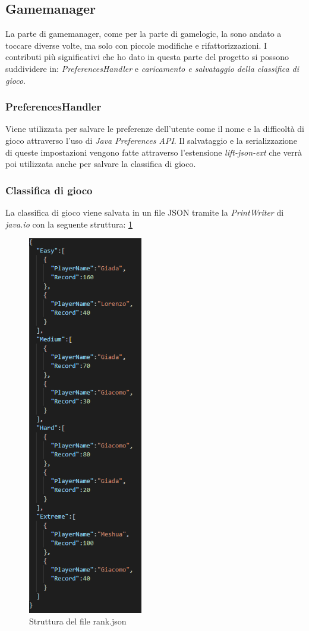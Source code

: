 \subsection{Gamemanager}
La parte di gamemanager, come per la parte di gamelogic, la sono andato a toccare diverse volte, ma solo con piccole modifiche e rifattorizzazioni.
I contributi più significativi che ho dato in questa parte del progetto si possono suddividere in: \textit{PreferencesHandler} e \textit{caricamento e salvataggio della classifica di gioco}.

\subsubsection{PreferencesHandler}
Viene utilizzata per salvare le preferenze dell'utente come il nome e la difficoltà di gioco attraverso l'uso di \textit{Java Preferences API}.
Il salvataggio e la serializzazione di queste impostazioni vengono fatte attraverso l'estensione \textit{lift-json-ext} che verrà poi utilizzata anche per salvare la classifica di gioco.

\subsubsection{Classifica di gioco}
La classifica di gioco viene salvata in un file JSON tramite la \textit{PrintWriter} di \textit{java.io} con la seguente struttura: \ref{json}

\begin{figure}[H]
  \includegraphics[width=5cm]{../res/6-implementazione/chiana/json.png}
  \caption{Struttura del file rank.json}
  \label{json}
\end{figure}

